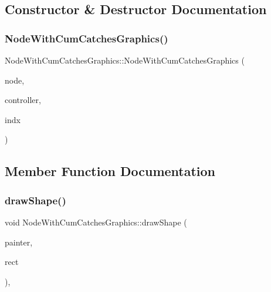 \subsection{Constructor \& Destructor Documentation}
\mbox{\label{class_node_with_cum_catches_graphics_a6ac3177ea9f86a0a2120bade452247b6}} 
\subsubsection{\texorpdfstring{NodeWithCumCatchesGraphics()}{NodeWithCumCatchesGraphics()}}
{\footnotesize\ttfamily Node\+With\+Cum\+Catches\+Graphics\+::\+Node\+With\+Cum\+Catches\+Graphics (\begin{DoxyParamCaption}\item[{\mbox{\hyperlink{class_node_data}{Node\+Data}} $\ast$}]{node,  }\item[{\mbox{\hyperlink{class_map_objects_controller}{Map\+Objects\+Controller}} $\ast$}]{controller,  }\item[{int}]{indx }\end{DoxyParamCaption})\hspace{0.3cm}{\ttfamily [inline]}}



\subsection{Member Function Documentation}
\mbox{\label{class_node_with_cum_catches_graphics_ad96a95e9bf6028bc623f7321c639d933}} 
\subsubsection{\texorpdfstring{drawShape()}{drawShape()}}
{\footnotesize\ttfamily void Node\+With\+Cum\+Catches\+Graphics\+::draw\+Shape (\begin{DoxyParamCaption}\item[{Q\+Painter \&}]{painter,  }\item[{const qmapcontrol\+::\+Rect\+World\+Px \&}]{rect }\end{DoxyParamCaption})\hspace{0.3cm}{\ttfamily [protected]}, {\ttfamily [virtual]}}



